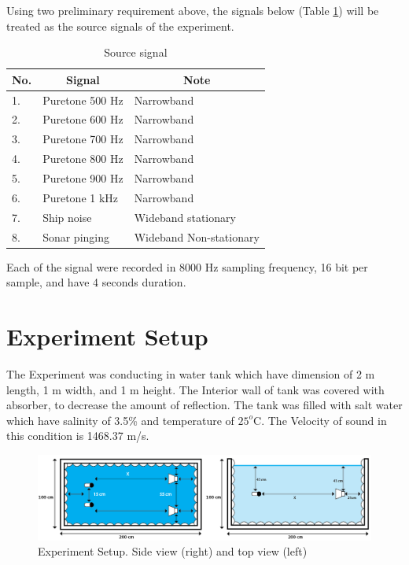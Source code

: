 \documentclass[a4paper]{jpconf}
\begin{document}
Using two preliminary requirement above, the signals below (Table \ref{table:source}) will be treated as the source signals of the experiment.

\begin{table}[h]
\centering
\caption{Source signal}
\label{table:source}
\begin{tabular}{|l|l|l|}
\hline
\multicolumn{1}{|c|}{No.} & \multicolumn{1}{c|}{Signal} & \multicolumn{1}{c|}{Note} \\ \hline
1.                        & Puretone 500 Hz             & Narrowband                \\ \hline
2.                        & Puretone 600 Hz             & Narrowband                \\ \hline
3.                        & Puretone 700 Hz             & Narrowband                \\ \hline
4.                        & Puretone 800 Hz             & Narrowband                \\ \hline
5.                        & Puretone 900 Hz             & Narrowband                \\ \hline
6.                        & Puretone 1 kHz              & Narrowband                \\ \hline
7.                        & Ship noise                  & Wideband stationary       \\ \hline
8.                        & Sonar pinging               & Wideband Non-stationary   \\ \hline
\end{tabular}
\end{table}

Each of the signal were recorded in 8000 Hz sampling frequency, 16 bit per sample, and have 4 seconds duration.

\section{Experiment Setup}
The Experiment was conducting in water tank which have dimension of 2 m length, 1 m width, and 1 m height. The Interior wall of tank was covered with absorber, to decrease the amount of reflection. The tank was filled with salt water which have salinity of 3.5\% and temperature of $25^o$C. The Velocity of sound in this condition is 1468.37 m/s.

\begin{figure}[h]
\begin{center}
\includegraphics[width=5in]{experimentSetupwide.png}
\end{center}
\caption{\label{pict:setup}Experiment Setup. Side view (right) and top view (left)}
\end{figure}
\end{document}
